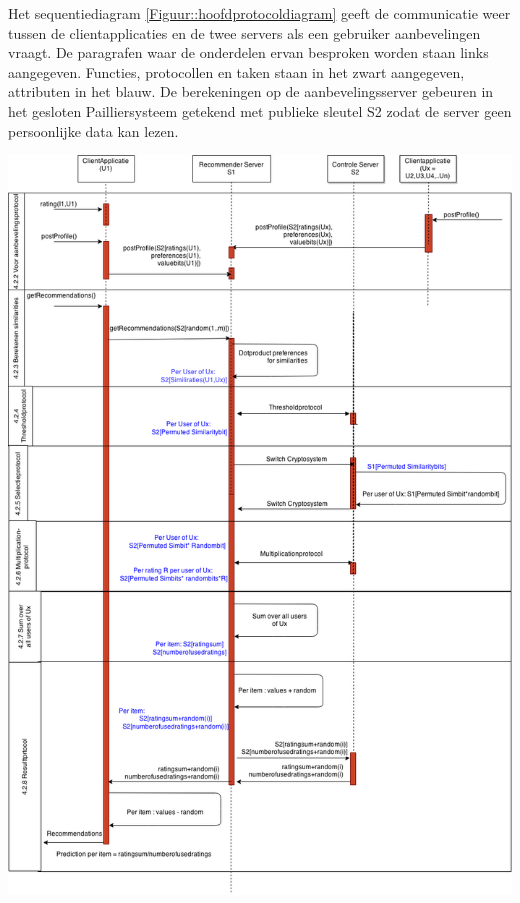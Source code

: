 Het sequentiediagram \ref{Figuur::hoofdprotocoldiagram} geeft de communicatie weer tussen de clientapplicaties en de twee servers als een gebruiker aanbevelingen vraagt. De paragrafen waar de onderdelen ervan besproken worden staan links aangegeven. Functies, protocollen en taken staan in het zwart aangegeven, attributen in het blauw. De berekeningen op de aanbevelingsserver gebeuren in het gesloten Pailliersysteem getekend met publieke sleutel S2 zodat de server geen persoonlijke data kan lezen.

\begin{center}
\centering
\includegraphics[width=1.0\textwidth,keepaspectratio]{fig/hoofdprotocol_privacy}   %
\label{Figuur::hoofdprotocoldiagram}%
\end{center}



